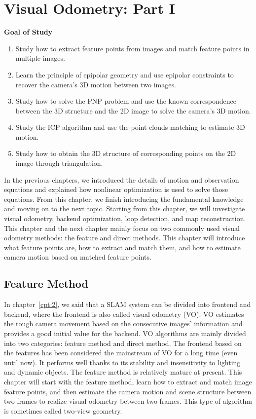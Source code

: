 \chapter{Visual Odometry: Part I}
\label{cpt:7}
\thispagestyle{empty}

\begin{mdframed}  
	\textbf{Goal of Study}
	\begin{enumerate}[labelindent=0em,leftmargin=1.5em]
		\item Study how to extract feature points from images and match feature points in multiple images.
		\item Learn the principle of epipolar geometry and use epipolar constraints to recover the camera's 3D motion between two images.
		\item Study how to solve the PNP problem and use the known correspondence between the 3D structure and the 2D image to solve the camera's 3D motion.	
		\item Study the ICP algorithm and use the point clouds matching to estimate 3D motion.
		\item Study how to obtain the 3D structure of corresponding points on the 2D image through triangulation.
	\end{enumerate}
\end{mdframed}

In the previous chapters, we introduced the details of motion and observation equations and explained how nonlinear optimization is used to solve those equations. From this chapter, we finish introducing the fundamental knowledge and moving on to the next topic. Starting from this chapter, we will investigate visual odometry, backend optimization, loop detection, and map reconstruction. This chapter and the next chapter mainly focus on two commonly used visual odometry methods: the feature and direct methods. This chapter will introduce what feature points are, how to extract and match them, and how to estimate camera motion based on matched feature points.

%

\newpage

\section{Feature Method}
In chapter~\ref{cpt:2}, we said that a SLAM system can be divided into frontend and backend, where the frontend is also called visual odometry (VO). VO estimates the rough camera movement based on the consecutive images' information and provides a good initial value for the backend. VO algorithms are mainly divided into two categories: feature method and direct method. The frontend based on the features has been considered the mainstream of VO for a long time (even until now). It performs well thanks to its stability and insensitivity to lighting and dynamic objects. The feature method is relatively mature at present. This chapter will start with the feature method, learn how to extract and match image feature points, and then estimate the camera motion and scene structure between two frames to realize visual odometry between two frames. This type of algorithm is sometimes called two-view geometry.


